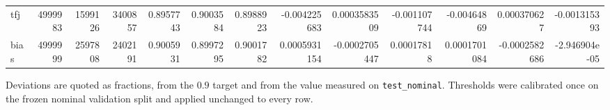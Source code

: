 \begin{landscape}
\begin{table}[p]
\begin{tabular}{l rrr rrr rrr rrr}
tfj & 4999983 & 1599126 & 3400857 & 0.8957743 & 0.9003584 & 0.8988923 & -0.004225683 & 0.0003583509 & -0.001107744 & -0.00464869 & 0.000370627 & -0.001315393 \\
bias & 4999999 & 2597808 & 2402191 & 0.9005931 & 0.8997295 & 0.9001782 & 0.0005931154 & -0.0002705447 & 0.00017818 & 0.0001701084 & -0.0002582686 & -2.946904e-05 \\
\bottomrule
\end{tabular}
\par\vspace{4pt}
\begin{minipage}{\textwidth}\footnotesize Deviations are quoted as fractions, from the $0.9$ target and from the value measured on \texttt{test\_nominal}. Thresholds were calibrated once on the frozen nominal validation split and applied unchanged to every row.\end{minipage}
\end{table}
\end{landscape}
